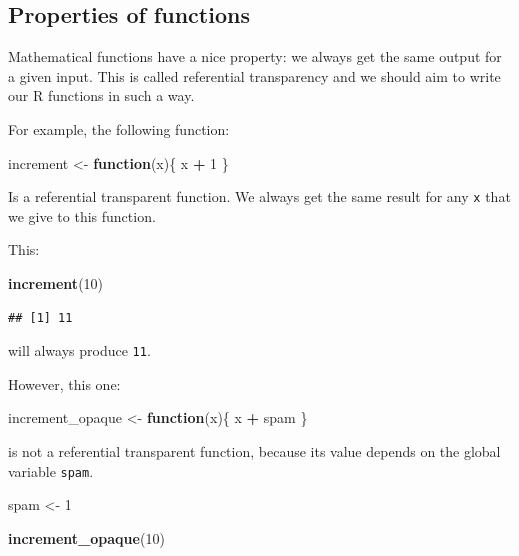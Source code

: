 \documentclass[]{gitbook}
\newenvironment{Shaded}{\begin{snugshade}}{\end{snugshade}}
\newcommand{\ControlFlowTok}[1]{\textcolor[rgb]{0.13,0.29,0.53}{\textbf{#1}}}
\newcommand{\DecValTok}[1]{\textcolor[rgb]{0.00,0.00,0.81}{#1}}
\newcommand{\KeywordTok}[1]{\textcolor[rgb]{0.13,0.29,0.53}{\textbf{#1}}}
\newcommand{\NormalTok}[1]{#1}
\newcommand{\OperatorTok}[1]{\textcolor[rgb]{0.81,0.36,0.00}{\textbf{#1}}}
\newcommand{\StringTok}[1]{\textcolor[rgb]{0.31,0.60,0.02}{#1}}
\begin{document}
\hypertarget{properties-of-functions}{%
\subsection{Properties of functions}\label{properties-of-functions}}

Mathematical functions have a nice property: we always get the same output for a given input. This
is called referential transparency and we should aim to write our R functions in such a way.

For example, the following function:

\begin{Shaded}
\begin{Highlighting}[]
\NormalTok{increment <-}\StringTok{ }\ControlFlowTok{function}\NormalTok{(x)\{}
\NormalTok{    x }\OperatorTok{+}\StringTok{ }\DecValTok{1}
\NormalTok{\}}
\end{Highlighting}
\end{Shaded}

Is a referential transparent function. We always get the same result for any \texttt{x} that we give to
this function.

This:

\begin{Shaded}
\begin{Highlighting}[]
\KeywordTok{increment}\NormalTok{(}\DecValTok{10}\NormalTok{)}
\end{Highlighting}
\end{Shaded}

\begin{verbatim}
## [1] 11
\end{verbatim}

will always produce \texttt{11}.

However, this one:

\begin{Shaded}
\begin{Highlighting}[]
\NormalTok{increment_opaque <-}\StringTok{ }\ControlFlowTok{function}\NormalTok{(x)\{}
\NormalTok{    x }\OperatorTok{+}\StringTok{ }\NormalTok{spam}
\NormalTok{\}}
\end{Highlighting}
\end{Shaded}

is not a referential transparent function, because its value depends on the global variable \texttt{spam}.

\begin{Shaded}
\begin{Highlighting}[]
\NormalTok{spam <-}\StringTok{ }\DecValTok{1}

\KeywordTok{increment_opaque}\NormalTok{(}\DecValTok{10}\NormalTok{)}
\end{Highlighting}
\end{Shaded}
\end{document}
